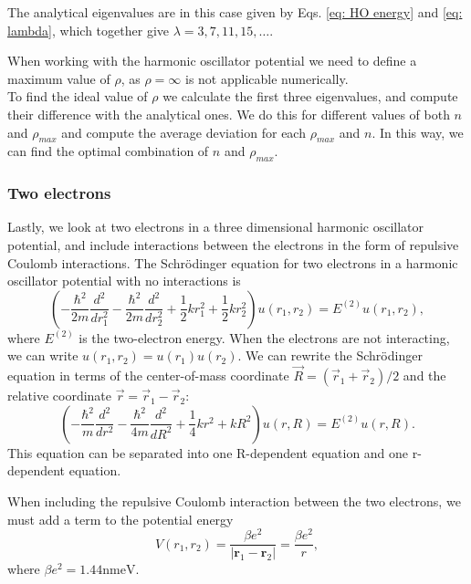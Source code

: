 \documentclass[%
 reprint,
nofootinbib,
aps,
]{revtex4-1}
\begin{document}
The analytical eigenvalues are in this case given by Eqs. \eqref{eq: HO energy} and \eqref{eq: lambda}, which together give $\lambda = 3, 7, 11, 15, \dots$.

When working with the harmonic oscillator potential we need to define a maximum value of $\rho$, as $\rho = \infty$ is not applicable numerically.\\To find the ideal value of $\rho$ we calculate the first three eigenvalues, and compute their difference with the analytical ones. We do this for different values of both $n$ and $\rho_{max}$ and compute the average deviation for each $\rho_{max}$ and $n$. In this way, we can find the optimal combination of $n$ and $\rho_{max}$.


\subsubsection{Two electrons}

Lastly, we look at two electrons in a three dimensional harmonic oscillator potential, and include  interactions between the electrons in the form of repulsive Coulomb interactions. The Schrödinger equation for two electrons in a harmonic oscillator potential with no interactions is
\begin{equation}
\left(  -\frac{\hbar^2}{2 m} \frac{d^2}{dr_1^2} -\frac{\hbar^2}{2 m} \frac{d^2}{dr_2^2}+ \frac{1}{2}k r_1^2+ \frac{1}{2}k r_2^2\right)u(r_1,r_2)  = E^{(2)} u(r_1,r_2),
\end{equation}
where $E^{(2)}$ is the two-electron energy. When the electrons are not interacting, we can write $u(r_1, r_2) = u(r_1)u(r_2)$. We can rewrite the Schrödinger equation in terms of the center-of-mass coordinate $\vec{R} = (\vec{r}_1 + \vec{r}_2)/2$ and the relative coordinate $\vec{r} = \vec{r}_1 - \vec{r}_2$:
\begin{equation}
\left(  -\frac{\hbar^2}{m} \frac{d^2}{dr^2} -\frac{\hbar^2}{4 m} \frac{d^2}{dR^2}+ \frac{1}{4} k r^2+  kR^2\right)u(r,R)  = E^{(2)} u(r,R).
\end{equation}
This equation can be separated into one R-dependent equation and one r-dependent equation.

When including the repulsive Coulomb interaction between the two electrons, we must add a term to the potential energy
\begin{equation}
V(r_1,r_2) = \frac{\beta e^2}{|\mathbf{r}_1-\mathbf{r}_2|}=\frac{\beta e^2}{r},
\end{equation}
where $\beta e^2=1.44\mathrm{nmeV}$.
\end{document}
